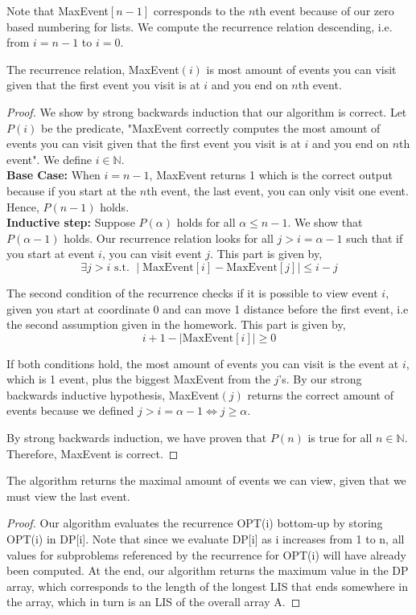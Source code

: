 \documentclass[11pt]{scrartcl}
\begin{document}
Note that MaxEvent$[n-1]$ corresponds to the $n$th event because of our zero based numbering for lists. We compute
the recurrence relation descending, i.e. from $i = n-1$ to $i=0$.
\begin{theorem*}
	The recurrence relation, MaxEvent$(i)$ is most amount of events you can visit given that the first event you visit is at $i$ 
	and you end on $n$th event.
	\begin{proof}
		We show by strong backwards induction that our algorithm is correct. Let $P(i)$ be the predicate,
		"MaxEvent correctly computes the most amount of events you can visit given that the first event you visit is at $i$ 
		and you end on $n$th event".
		We define $i\in \mathbb{N}$. \\
		\textbf{Base Case:} When $i = n - 1$, MaxEvent returns 1 which is the correct output because if you start 
		at the $n$th event, the last event, you can only visit one event. Hence, $P(n-1)$ holds.\\
		\textbf{Inductive step:} Suppose $P(\alpha)$ holds for all $\alpha \leq n - 1$. We show that $P(\alpha-1)$ holds.
		Our recurrence relation looks for all $j > i = \alpha-1$ such that if you start at event $i$, you can visit event $j$.
		This part is given by, $$\exists j > i \text{ s.t. } \mid \text{MaxEvent}[i]-\text{MaxEvent}[j] \mid \leq i - j$$
		\par The second condition of the recurrence checks if it is possible to view event $i$, given you start at coordinate 0
		and can move 1 distance before the first event, i.e the second assumption given in the homework. This part is given by, 
		$$ i + 1 - \mid \text{MaxEvent}[i] \mid  \geq 0$$
		\par If both conditions hold, the most amount of events you can visit is the event at $i$, which is 1 event, plus
		the biggest MaxEvent from the $j$'s. By our strong backwards inductive hypothesis,
		MaxEvent$(j)$ returns the correct amount of events because we defined 
		$ j > i = \alpha - 1 \Leftrightarrow j \geq \alpha$. 

		
		\par By strong backwards induction, we have proven that $P(n)$ is true for all $n \in \mathbb{N}$.
		Therefore, MaxEvent is correct.
	\end{proof}
\end{theorem*}

\begin{theorem*}
The algorithm returns the maximal amount of events we can view, given that we must view the last event.

\begin{proof}
	Our algorithm evaluates the recurrence OPT(i) bottom-up by storing OPT(i) in DP[i].
	Note that since we evaluate DP[i] as i increases from 1 to n, all values for subproblems 
	referenced by the recurrence for OPT(i) will have already been computed. At the end, our 
	algorithm returns the maximum value in the DP array, which corresponds to the length of the 
	longest LIS that ends somewhere in the array, which in turn is an LIS of the overall array A.
\end{proof}

\end{theorem*}
\end{document}
